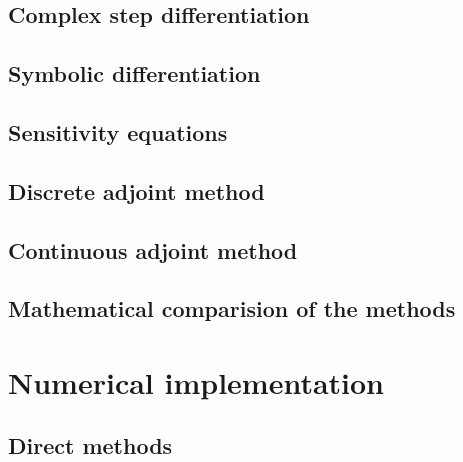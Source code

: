 \documentclass[12pt]{article}
\begin{document}
\subsection{Complex step differentiation}
\label{section:comple-step-differentiation}


\subsection{Symbolic differentiation}
\label{section:symbolic}


\subsection{Sensitivity equations}
\label{section:sensitivity-equation}


% 

\subsection{Discrete adjoint method}


\subsection{Continuous adjoint method}


\subsection{Mathematical comparision of the methods}
\label{section:compatison-math}


\section{Numerical implementation}
\label{sec:computational-implementation}

\subsection{Direct methods}
\label{section:direct-methods}

\end{document}
